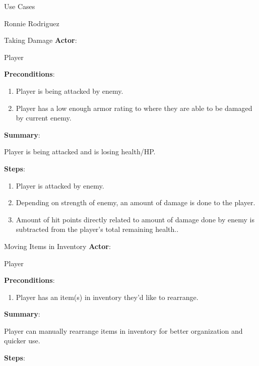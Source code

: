 \documentclass[12pt]{report}
\begin{document}
\begin{section}{Use Cases}
\begin{subsection}{Ronnie Rodriguez}
\begin{subsubsection}{Taking Damage}
\textbf{Actor}:

Player

\textbf{Preconditions}:

\begin{enumerate}
\item Player is being attacked by enemy.
\item Player has a low enough armor rating to where they are able to be
damaged by current enemy.
\end{enumerate}

\textbf{Summary}:

Player is being attacked and is losing health/HP.

\textbf{Steps}:

\begin{enumerate}
\item Player is attacked by enemy.
\item Depending on strength of enemy, an amount of damage is done to the
player.
\item Amount of hit points directly related to amount of damage done by
enemy is subtracted from the player's total remaining health..
\end{enumerate}
\end{subsubsection}

\begin{subsubsection}{Moving Items in Inventory}
\textbf{Actor}:

Player

\textbf{Preconditions}:

\begin{enumerate}
\item Player has an item(s) in inventory they'd like to rearrange.
\end{enumerate}

\textbf{Summary}:

Player can manually rearrange items in inventory for better
organization and quicker use.

\textbf{Steps}:


\end{subsubsection}
\end{subsection}
\end{section}
\end{document}
